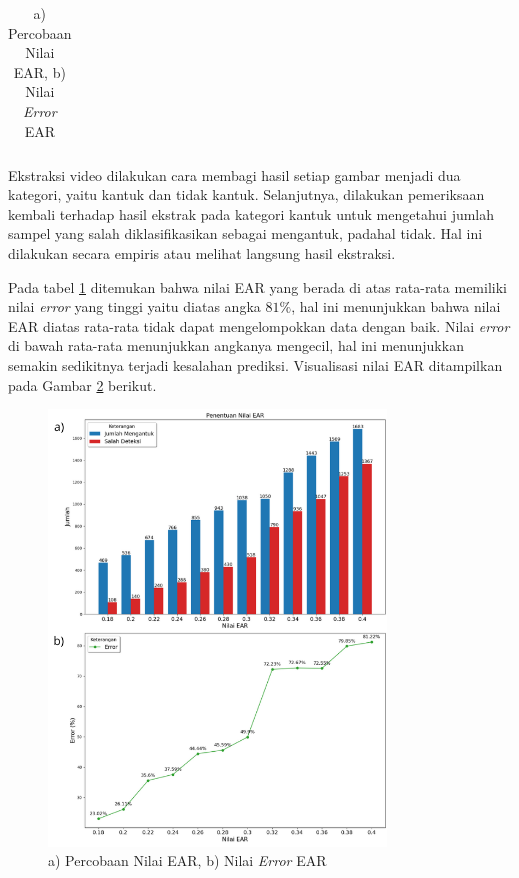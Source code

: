 \begin{table}[H]
\begin{table}[h]
\begin{tabular}{ccccc}
                    \bottomrule
                \end{tabular}
                \label{Penentuan Nilai EAR}
            \end{table}

           Ekstraksi video dilakukan cara membagi hasil setiap gambar menjadi dua kategori, yaitu kantuk dan tidak kantuk. Selanjutnya, dilakukan pemeriksaan kembali terhadap hasil ekstrak pada kategori kantuk untuk mengetahui jumlah sampel yang salah diklasifikasikan sebagai mengantuk, padahal tidak. Hal ini dilakukan secara empiris atau melihat langsung hasil ekstraksi.


            Pada tabel \ref{Penentuan Nilai EAR} ditemukan bahwa nilai EAR yang berada di atas rata-rata memiliki nilai \textit{error} yang tinggi yaitu diatas angka $ 81\%$, hal ini menunjukkan bahwa nilai EAR diatas rata-rata tidak dapat mengelompokkan data dengan baik. Nilai \textit{error} di bawah rata-rata menunjukkan angkanya mengecil, hal ini menunjukkan semakin sedikitnya terjadi kesalahan prediksi. Visualisasi nilai EAR ditampilkan pada Gambar \ref{Eksperimen Penentuan Nilai EAR} berikut.

             \begin{figure}[H]
             \centering
                 \includegraphics[width=0.8\textwidth]{figures/bab4/penentuan nilai ear.png}
                 \caption{a) Percobaan Nilai EAR, b) Nilai \textit{Error} EAR}
                 \label{Eksperimen Penentuan Nilai EAR}
             \end{figure}



\end{table}
